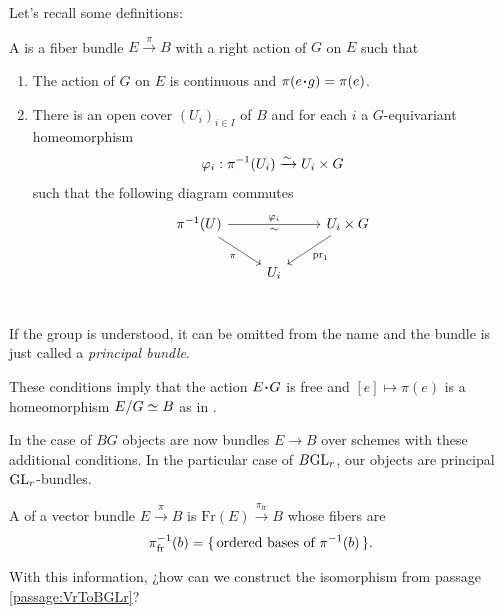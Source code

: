 \documentclass[12pt]{memoir}
\newcounter{passage}
\begin{document}
\begin{ptcb}
    Let's recall some definitions:
    \begin{nonum-Def}\label{def:PrincipalBundle}
        A  is a fiber bundle \(E\xrightarrow{\pi}B\) with a right action of \(G\) on \(E\) such that
        \begin{enumerate}
            \item The action of \(G\) on \(E\) is continuous and \(\pi(e\.g)=\pi(e)\).
            \item There is an open cover \((U_i)_{i\in I}\) of \(B\) and for each \(i\) a \(G\)-equivariant homeomorphism
            \[
                \varphi_i:\pi^{-1}(U_i)\xrightarrow{\sim} U_i\times G
            \] 
            such that the following diagram commutes
            \[
            \begin{tikzcd}
                \pi^{-1}(U)\arrow[dr,"\pi"'] \arrow[rr,"\vf_i","\sim"'] && U_i\x G\arrow[dl,"\pr_1"] \\
                & U_i  \\
            \end{tikzcd}
            \]
        \end{enumerate}
    \end{nonum-Def}
    If the group is understood, it can be omitted from the name and the bundle is just called a \emph{principal bundle}.\par
    These conditions imply that the action \(E\.G\) is free and \([e]\mapsto \pi(e)\) is a homeomorphism \(E/G\simeq B\) as in \cite{notes:mitchell-principal}.\par
    In the case of \(BG\) objects are now bundles \(E\to B\) over schemes with these additional conditions. In the particular case of \(B\mathrm{GL}_r\), our objects are principal \(\mathrm{GL}_r\)-bundles.
    \begin{nonum-Def}
        A  of a vector bundle \(E\xrightarrow{\pi} B\) is \(\text{Fr}(E)\xrightarrow{\pi_{\text{fr}}} B\) whose fibers are 
        \[
        \pi_{\text{fr}}^{-1}(b)=\{\,\text{ordered bases of }\pi^{-1}(b)\,\}.
        \]
    \end{nonum-Def}

    \begin{Qn}
        With this information, ¿how can we construct the isomorphism from passage \ref{passage:VrToBGLr}?
    \end{Qn}
    \tcbline
\end{ptcb}
\end{document}

